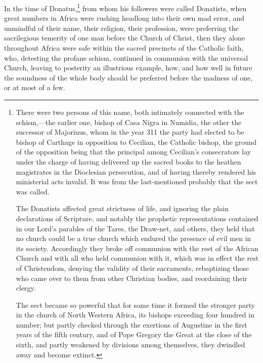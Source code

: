 In the time of Donatus,\footnote{There were two persons of this name, both intimately connected with the schism,—the earlier one, bishop of Casa Nigra in Numidia, the other the successor of Majorinus, whom in the year 311 the party had elected to be bishop of Carthage in opposition to Cecilian, the Catholic bishop, the ground of the opposition being that the principal among Cecilian’s consecrators lay under the charge of having delivered up the sacred books to the heathen magistrates in the Dioclesian persecution, and of having thereby rendered his ministerial acts invalid. It was from the last-mentioned probably that the sect was called. \par The Donatists affected great strictness of life, and ignoring the plain declarations of Scripture, and notably the prophetic representations contained in our Lord’s parables of the Tares, the Draw-net, and others, they held that no church could be a true church which endured the presence of evil men in its society. Accordingly they broke off communion with the rest of the African Church and with all who held communion with it, which was in effect the rest of Christendom, denying the validity of their sacraments, rebaptizing those who came over to them from other Christian bodies, and reordaining their clergy. \par The sect became so powerful that for some time it formed the stronger party in the church of North Western Africa, its bishops exceeding four hundred in number; but partly checked through the exertions of Augustine in the first years of the fifth century, and of Pope Gregory the Great at the close of the sixth, and partly weakened by divisions among themselves, they dwindled away and become extinct.} from whom his followers were called Donatists, when great numbers in Africa were rushing headlong into their own mad error, and unmindful of their name, their religion, their profession, were preferring the sacrilegious temerity of one man before the Church of Christ, then they alone throughout Africa were safe within the sacred precincts of the Catholic faith, who, detesting the profane schism, continued in communion with the universal Church, leaving to posterity an illustrious example, how, and how well in future the soundness of the whole body should be preferred before the madness of one, or at most of a few.

